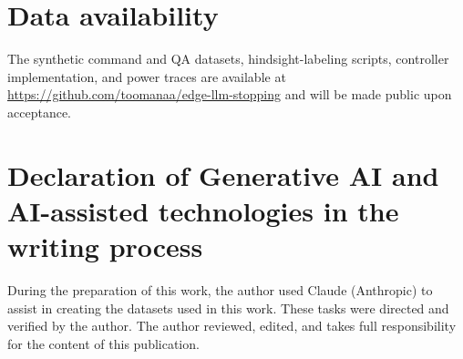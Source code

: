 \documentclass[review,12pt]{elsarticle}
\begin{document}
\section*{Data availability}
The synthetic command and QA datasets, hindsight-labeling scripts,
controller implementation, and power traces are available at
\url{https://github.com/toomanaa/edge-llm-stopping} and will be made
public upon acceptance.

\section*{Declaration of Generative AI and AI-assisted technologies in
the writing process}
During the preparation of this work, the author used Claude (Anthropic)
to assist in creating the datasets used in this work. These tasks were directed and
verified by the author. The author reviewed, edited, and takes full
responsibility for the content of this publication.



\end{document}
